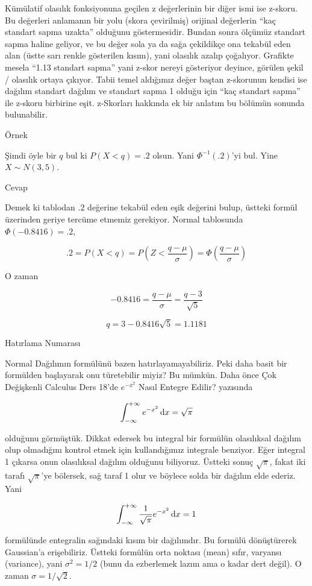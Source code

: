 \documentclass[12pt,fleqn]{article}\usepackage{../../common}
\begin{document}
Kümülatif olasılık fonksiyonuna geçilen z değerlerinin bir diğer ismi ise
z-skoru. Bu değerleri anlamanın bir yolu (skora çevirilmiş) orijinal
değerlerin ``kaç standart sapma uzakta'' olduğunu göstermesidir. Bundan
sonra ölçümüz standart sapma haline geliyor, ve bu değer sola ya da sağa
çekildikçe ona tekabül eden alan (üstte sarı renkle gösterilen kısım), yani
olasılık azalıp çoğalıyor. Grafikte mesela ``1.13 standart sapma'' yani
z-skor nereyi gösteriyor deyince, görülen şekil / olasılık ortaya
çıkıyor. Tabii temel aldığımız değer baştan z-skorunun kendisi ise dağılım
standart dağılım ve standart sapma 1 olduğu için ``kaç standart sapma'' ile
z-skoru birbirine eşit. z-Skorları hakkında ek bir anlatım bu bölümün
sonunda bulunabilir.

Örnek 

Şimdi öyle bir $q$ bul ki $P(X < q) = .2$ olsun. Yani $\Phi^{-1}(.2)$'yi
bul. Yine $X \sim N(3,5)$. 

Cevap 

Demek ki tablodan $.2$ değerine tekabül eden eşik değerini bulup, üstteki
formül üzerinden geriye tercüme etmemiz gerekiyor. Normal tablosunda
$\Phi(-0.8416) = .2$, 

$$ .2 = P(X<q) = P( Z < \frac{ q - \mu}{\sigma}) = \Phi(\frac{ q - \mu}{\sigma})
$$

O zaman 

$$ -0.8416 = \frac{q - \mu}{\sigma} = \frac{ q - 3}{\sqrt{ 5}} $$

$$ q = 3 - 0.8416 \sqrt{ 5} = 1.1181 $$

Hatırlama Numarası

Normal Dağılımın formülünü bazen hatırlayamayabiliriz. Peki daha basit bir
formülden başlayarak onu türetebilir miyiz? Bu mümkün. Daha önce Çok
Değişkenli Calculus Ders 18'de $e^{-x^2}$ Nasıl Entegre Edilir? yazısında

$$ \int _{-\infty}^{+\infty} e^{-x^2} \,\mathrm{d} x= \sqrt{\pi} $$

olduğunu görmüştük. Dikkat edersek bu integral bir formülün olasılıksal dağılım
olup olmadığını kontrol etmek için kullandığımız integrale benziyor. Eğer
integral 1 çıkarsa onun olasılıksal dağılım olduğunu biliyoruz. Üstteki sonuç
$\sqrt{\pi}$, fakat iki tarafı $\sqrt{\pi}$'ye bölersek, sağ taraf 1 olur ve
böylece solda bir dağılım elde ederiz. Yani

$$ \int _{-\infty}^{+\infty} \frac{1}{\sqrt{\pi}} e^{-x^2} \,\mathrm{d} x = 1$$

formülünde entegralin sağındaki kısım bir dağılımdır. Bu formülü dönüştürerek
Gaussian'a erişebiliriz. Üstteki formülün orta noktası (mean) sıfır, varyansı
(variance), yani $\sigma^2 = 1/2$ (bunu da ezberlemek lazım ama o kadar dert
değil). O zaman $\sigma = 1 / \sqrt{2}$.
\end{document}
